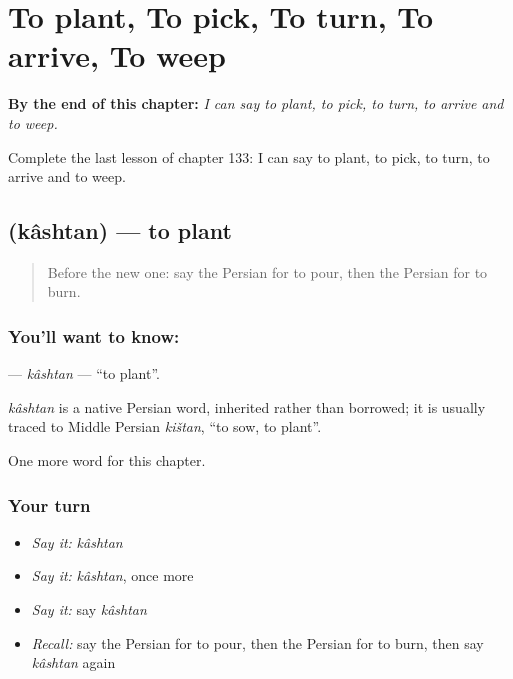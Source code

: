 
\chapter{To plant, To pick, To turn, To arrive, To weep}
\label{ch:fa-to-plant-to-pick-to-turn-to-arrive-to-weep}

\begin{chapteropening}
\textbf{By the end of this chapter:} \emph{I can say to plant, to pick, to turn, to arrive and to weep.}

Complete the last lesson of chapter 133: I can say to plant, to pick, to turn, to arrive and to weep.
\end{chapteropening}

\section[\texorpdfstring{\fa{کاشتن} (kâshtan)}{کاشتن (kâshtan)}]{ (kâshtan) — to plant}

\label{lesson:FA-C133-kashtan}



\begin{quote}
Before the new one: say the Persian for to pour, then the Persian for to burn.
\end{quote}

\subsection*{You'll want to know: }
\textbf{} — \emph{kâshtan} — \textquotedblleft{}to plant\textquotedblright{}.

\begin{cousinweb}
\emph{kâshtan} is a native Persian word, inherited rather than borrowed; it is usually traced to Middle Persian \emph{kištan}, \textquotedblleft{}to sow, to plant\textquotedblright{}.
\end{cousinweb}

\begin{grammarlens}[title={What you've built}]
One more word for this chapter.
\end{grammarlens}

\subsection*{Your turn}
\begin{itemize}
\raggedright
  \item \emph{Say it:} \emph{kâshtan}
  \item \emph{Say it:} \emph{kâshtan}, once more
  \item \emph{Say it:} say \emph{kâshtan}
  \item \emph{Recall:} say the Persian for to pour, then the Persian for to burn, then say \emph{kâshtan} again
\end{itemize}

